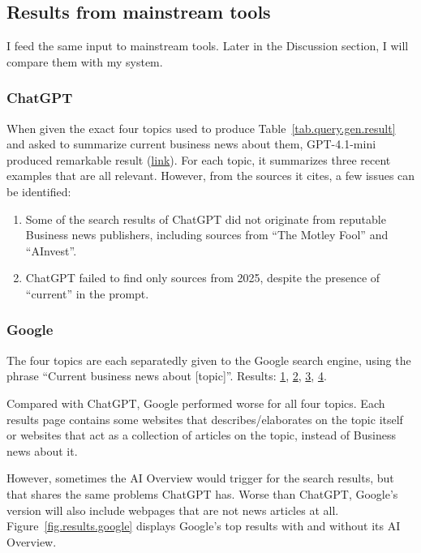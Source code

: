 \documentclass[final-report]{report-template}
\begin{document}
\subsection{Results from mainstream tools}
I feed the same input to mainstream tools. Later in the Discussion section, I
will compare them with my system.

\subsubsection{ChatGPT}
When given the exact four topics used to produce
Table~\ref{tab.query.gen.result} and asked to summarize current business news
about them, GPT-4.1-mini produced remarkable result
(\href{https://chatgpt.com/share/689a428d-f01c-8011-a115-57b4ca19a278}{link}).
For each topic, it summarizes three recent examples that are all relevant.
However, from the sources it cites, a few issues can be identified:
\begin{enumerate}
	\item Some of the search results of ChatGPT did not originate from
		reputable Business news publishers, including sources from ``The Motley
		Fool'' and ``AInvest''.
	\item ChatGPT failed to find only sources from 2025, despite the presence of
		``current'' in the prompt.
\end{enumerate}

\subsubsection{Google}
The four topics are each separatedly given to the Google search engine, using
the phrase ``Current business news about [topic]''. Results: 
\href{https://www.google.com/search?q=Current+business+news+about+vertical+integration}{1}, 
\href{https://www.google.com/search?q=Current+business+news+about+diversification+strategies}{2}, 
\href{https://www.google.com/search?q=Current+business+news+about+competitive+advantage}{3}, 
\href{https://www.google.com/search?q=Current+business+news+about+foreign+direct+investment}{4}.

Compared with ChatGPT, Google performed worse for all four topics. Each
results page contains some websites that describes/elaborates on the topic
itself or websites that act as a collection of articles on the topic, instead
of Business news about it. 

However, sometimes the AI Overview would trigger for the search results, but
that shares the same problems ChatGPT has. Worse than ChatGPT, Google's version
will also include webpages that are not news articles at all.
Figure~\ref{fig.results.google} displays Google's top results with and without
its AI Overview.
\end{document}
